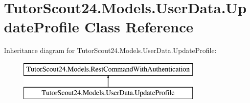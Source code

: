 \hypertarget{class_tutor_scout24_1_1_models_1_1_user_data_1_1_update_profile}{}\section{Tutor\+Scout24.\+Models.\+User\+Data.\+Update\+Profile Class Reference}
\label{class_tutor_scout24_1_1_models_1_1_user_data_1_1_update_profile}
Inheritance diagram for Tutor\+Scout24.\+Models.\+User\+Data.\+Update\+Profile\+:\begin{figure}[H]
\begin{center}
\leavevmode
\includegraphics[height=2.000000cm]{class_tutor_scout24_1_1_models_1_1_user_data_1_1_update_profile}
\end{center}
\end{figure}
